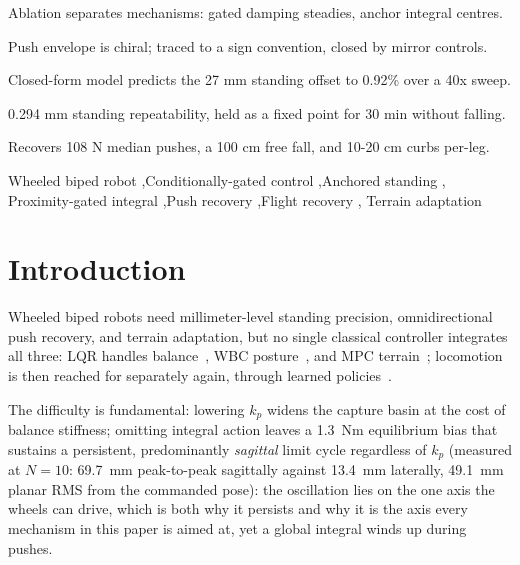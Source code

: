 \documentclass[a4paper,fleqn]{cas-dc}
\begin{document}
\begin{highlights}
\item Ablation separates mechanisms: gated damping steadies, anchor integral centres.
\item Push envelope is chiral; traced to a sign convention, closed by mirror controls.
\item Closed-form model predicts the 27 mm standing offset to 0.92\% over a 40x sweep.
\item 0.294 mm standing repeatability, held as a fixed point for 30 min without falling.
\item Recovers 108 N median pushes, a 100 cm free fall, and 10-20 cm curbs per-leg.
\end{highlights}

\begin{keywords}
Wheeled biped robot \sep Conditionally-gated control \sep Anchored standing \sep
Proximity-gated integral \sep Push recovery \sep Flight recovery \sep
Terrain adaptation
\end{keywords}

\maketitle

\printcredits

\section{Introduction}
\label{sec:intro}

Wheeled biped robots need millimeter-level standing precision, omnidirectional push recovery, and terrain adaptation, but no single classical controller integrates all three: LQR handles balance~\cite{klemm2019ascento}, WBC posture~\cite{klemm2020lqrwbc}, and MPC terrain~\cite{skater2024}; locomotion is then reached for separately again, through learned policies~\cite{hwangbo2019rl}.

The difficulty is fundamental: lowering $k_p$ widens the capture basin at the cost of balance stiffness; omitting integral action leaves a \SI{1.3}{Nm} equilibrium bias that sustains a persistent, predominantly \emph{sagittal} limit cycle regardless of $k_p$ (measured at $N{=}10$: \SI{69.7}{mm} peak-to-peak sagittally against \SI{13.4}{mm} laterally, \SI{49.1}{mm} planar RMS from the commanded pose): the oscillation lies on the one axis the wheels can drive, which is both why it persists and why it is the axis every mechanism in this paper is aimed at, yet a global integral winds up during pushes.
\end{document}
